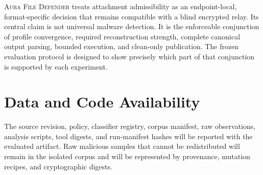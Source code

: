 \documentclass[preprint,12pt]{elsarticle}
\newcommand{\AFD}{\textsc{Aura File Defender}}
\begin{document}
\AFD{} treats attachment admissibility as an endpoint-local, format-specific
decision that remains compatible with a blind encrypted relay. Its central
claim is not universal malware detection. It is the enforceable conjunction of
profile convergence, required reconstruction strength, complete canonical
output parsing, bounded execution, and clean-only publication. The frozen
evaluation protocol is designed to show precisely which part of that
conjunction is supported by each experiment.

\section*{Data and Code Availability}

\enlargethispage{4\baselineskip}

The source revision, policy, classifier registry, corpus manifest, raw
observations, analysis scripts, tool digests, and run-manifest hashes will be
reported with the evaluated artifact. Raw malicious samples that cannot be
redistributed will remain in the isolated corpus and will be represented by
provenance, mutation recipes, and cryptographic digests.
\end{document}
